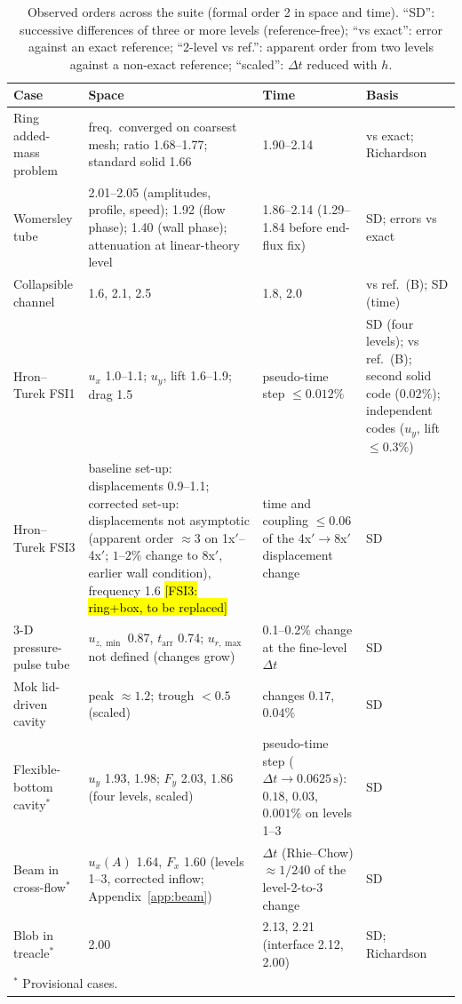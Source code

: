 \begin{table}[htbp]
	\centering
	\footnotesize
	\setlength{\tabcolsep}{3pt}
	\caption{Observed orders across the suite (formal order 2 in space and time). ``SD'': successive differences of three or more levels (reference-free); ``vs exact'': error against an exact reference; ``2-level vs ref.'': apparent order from two levels against a non-exact reference; ``scaled'': $\Delta t$ reduced with $h$.}
	\label{tab:orders}
	\begin{tabular}{p{3.0cm}p{4.6cm}p{3.4cm}p{2.8cm}}
		\toprule
		Case & Space & Time & Basis \\
		\midrule
		Ring added-mass problem & freq.\ converged on coarsest mesh; ratio 1.68--1.77; standard solid 1.66 & 1.90--2.14 & vs exact; Richardson \\
		Womersley tube & 2.01--2.05 (amplitudes, profile, speed); 1.92 (flow phase); 1.40 (wall phase); attenuation at linear-theory level & 1.86--2.14 (1.29--1.84 before end-flux fix) & SD; errors vs exact \\
		Collapsible channel & 1.6, 2.1, 2.5 & 1.8, 2.0 & vs ref.\ (B); SD (time) \\
		Hron--Turek FSI1 & $u_x$ 1.0--1.1; $u_y$, lift 1.6--1.9; drag 1.5 & pseudo-time step $\leq0.012\%$ & SD (four levels); vs ref.\ (B); second solid code ($0.02\%$); independent codes ($u_y$, lift $\leq0.3\%$) \\
		Hron--Turek FSI3 & baseline set-up: displacements 0.9--1.1; corrected set-up: displacements not asymptotic (apparent order $\approx3$ on 1x$'$--4x$'$; $1$--$2\%$ change to 8x$'$, earlier wall condition), frequency 1.6 \hl{[FSI3: ring+box, to be replaced]} & time and coupling $\leq0.06$ of the 4x$'\to$8x$'$ displacement change & SD \\
		3-D pressure-pulse tube & $u_{z,\min}$ 0.87, $t_\mathrm{arr}$ 0.74; $u_{r,\max}$ not defined (changes grow) & 0.1--0.2\% change at the fine-level $\Delta t$ & SD \\
		Mok lid-driven cavity & peak $\approx1.2$; trough $<0.5$ (scaled) & changes $0.17$, $0.04\%$ & SD \\
		Flexible-bottom cavity$^\ast$ & $u_y$ 1.93, 1.98; $F_y$ 2.03, 1.86 (four levels, scaled) & pseudo-time step ($\Delta t \to 0.0625\,\mathrm{s}$): $0.18$, $0.03$, $0.001\%$ on levels 1--3 & SD \\
		Beam in cross-flow$^\ast$ & $u_x(A)$ 1.64, $F_x$ 1.60 (levels 1--3, corrected inflow; Appendix~\ref{app:beam}) & $\Delta t$ (Rhie--Chow) $\approx1/240$ of the level-2-to-3 change & SD \\
		Blob in treacle$^\ast$ & 2.00 & 2.13, 2.21 (interface 2.12, 2.00) & SD; Richardson \\
		\bottomrule
		\multicolumn{4}{l}{$^\ast$ Provisional cases.}
	\end{tabular}
\end{table}

